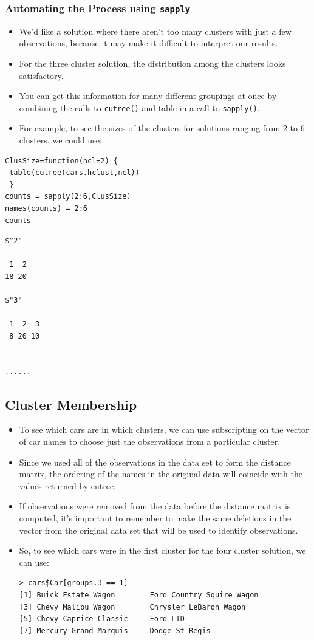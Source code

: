 \documentclass[12pt]{article}
\begin{document}
\subsubsection*{Automating the Process using \texttt{sapply}}
\begin{itemize}
\item We'd like a solution where there aren't too many clusters with just a few observations, because it may make it difficult to interpret our results. 
\item For the three cluster solution, the distribution among the clusters looks satisfactory.


\item You can get this information for many different groupings at once by combining the calls to \texttt{cutree()} and table in a call to \texttt{sapply()}. 
\item For example, to see the sizes of the clusters for solutions ranging from 2 to 6 clusters, we could use:
\end{itemize} 
\newpage
\begin{framed}
\begin{verbatim}
ClusSize=function(ncl=2) {
 table(cutree(cars.hclust,ncl))
 }
counts = sapply(2:6,ClusSize)
names(counts) = 2:6
counts
\end{verbatim}
\end{framed}
\begin{verbatim}
$"2"

 1  2
18 20

$"3"

 1  2  3
 8 20 10


......

\end{verbatim}
\newpage
\subsection*{Cluster Membership}
\begin{itemize}
\item To see which cars are in which clusters, we can use subscripting on the vector of car names to choose just the observations from a particular cluster. 
\item Since we used all of the observations in the data set to form the distance matrix, the ordering of the names in the original data will coincide with the values returned by cutree. 
\item If observations were removed from the data before the distance matrix is computed, it's important to remember to make the same deletions in the vector from the original data set that will be used to identify observations. 
\item So, to see which cars were in the first cluster for the four cluster solution, we can use:
{
\large
\begin{framed}
\begin{verbatim}
> cars$Car[groups.3 == 1]
[1] Buick Estate Wagon        Ford Country Squire Wagon
[3] Chevy Malibu Wagon        Chrysler LeBaron Wagon
[5] Chevy Caprice Classic     Ford LTD
[7] Mercury Grand Marquis     Dodge St Regis
\end{verbatim}
\end{framed}
}
\end{itemize}
\end{document}
